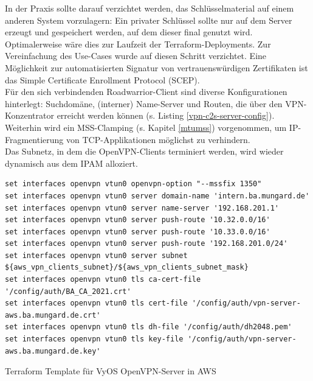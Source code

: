 In der Praxis sollte darauf verzichtet werden, das Schlüsselmaterial \glqq auf einem anderen System vorzulagern\grqq{}: Ein privater Schlüssel sollte nur auf dem Server erzeugt und gespeichert werden, auf dem dieser final genutzt wird. Optimalerweise wäre dies zur Laufzeit der Terraform-\gls{Deployment}s. Zur Vereinfachung des Use-Cases wurde auf diesen Schritt verzichtet. Eine Möglichkeit zur automatisierten Signatur von vertrauenswürdigen Zertifikaten ist das Simple Certificate Enrollment Protocol (SCEP)\cite[S.554]{Schmeh2013}.\\
Für den sich verbindenden \gls{Roadwarrior}-\gls{Client} sind diverse Konfigurationen hinterlegt: Suchdomäne, (interner) Name-Server und Routen, die über den \gls{VPN-Konzentrator} erreicht werden können (s. Listing \ref{vpn-c2s-server-config}).
Weiterhin wird ein \gls{MSS}-Clamping (s. Kapitel \ref{mtumss}) vorgenommen, um IP-Fragmen\-tierung von \gls{TCP}-Applikationen möglichst zu verhindern.\\
Das Subnetz, in dem die OpenVPN-\gls{Client}s terminiert werden, wird wieder dynamisch aus dem \gls{IPAM} alloziert.
\begin{listing}[h]
\begin{verbatim}
set interfaces openvpn vtun0 openvpn-option "--mssfix 1350"
set interfaces openvpn vtun0 server domain-name 'intern.ba.mungard.de'
set interfaces openvpn vtun0 server name-server '192.168.201.1'
set interfaces openvpn vtun0 server push-route '10.32.0.0/16'
set interfaces openvpn vtun0 server push-route '10.33.0.0/16'
set interfaces openvpn vtun0 server push-route '192.168.201.0/24'
set interfaces openvpn vtun0 server subnet ${aws_vpn_clients_subnet}/${aws_vpn_clients_subnet_mask}
set interfaces openvpn vtun0 tls ca-cert-file '/config/auth/BA_CA_2021.crt'
set interfaces openvpn vtun0 tls cert-file '/config/auth/vpn-server-aws.ba.mungard.de.crt'
set interfaces openvpn vtun0 tls dh-file '/config/auth/dh2048.pem'
set interfaces openvpn vtun0 tls key-file '/config/auth/vpn-server-aws.ba.mungard.de.key'
\end{verbatim}
\caption{Terraform Template für VyOS OpenVPN-Server in AWS}
\label{vpn-c2s-server-config}
\end{listing}

